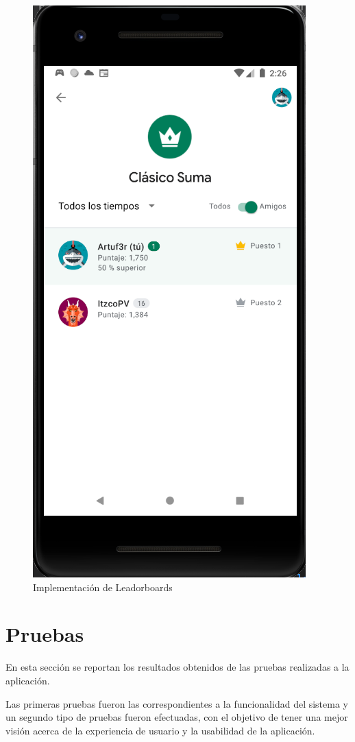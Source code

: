 \documentclass{article}
\begin{document}
\begin{figure}[H]
    \centering
    \includegraphics[scale=0.8]{imgs/Imp/Leaderboards}
    \caption{Implementación de Leadorboards}
\end{figure}


\section{Pruebas}
En esta sección se reportan los resultados obtenidos de las pruebas realizadas a la 
aplicación.

Las primeras pruebas fueron las correspondientes a la funcionalidad del sistema y 
un segundo tipo de pruebas fueron efectuadas, con el objetivo de tener una mejor 
visión acerca de la experiencia de usuario y la usabilidad de la aplicación.
\end{document}
